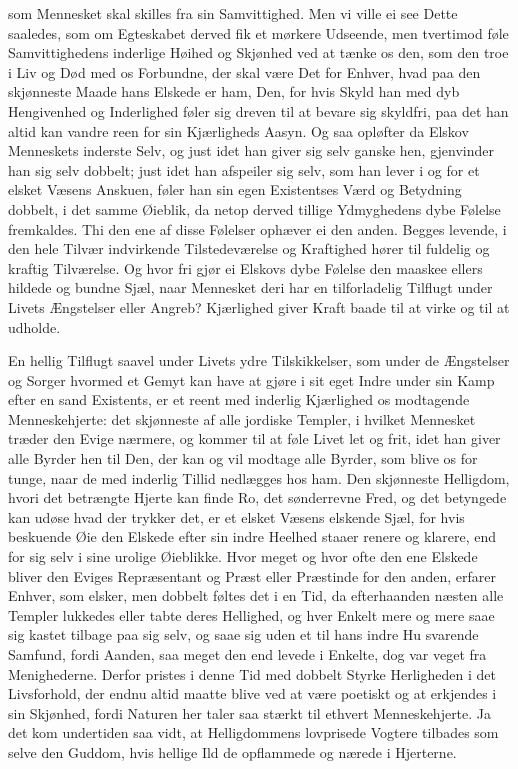 \documentclass[12pt,a4paper]{book}
\newcommand{\apage}[1]{\marginnote{\footnotesize\textit{[#1]}}}
\begin{document}
som Mennesket skal skilles fra sin Samvittighed. Men vi ville ei see
Dette saaledes, som om Egteskabet derved fik et mørkere Udseende, men
tvertimod føle Samvittighedens inderlige Høihed og Skjønhed ved at
tænke os den, som den troe i Liv og Død med os Forbundne, der skal være
Det for Enhver, hvad paa den skjønneste Maade hans Elskede er ham, Den,
for hvis Skyld han med dyb Hengivenhed og Inderlighed føler sig dreven
til at bevare sig skyldfri, paa det han altid kan vandre reen for sin
Kjærligheds Aasyn. Og saa opløfter da Elskov Menneskets inderste Selv,
og just idet han giver sig selv ganske hen, gjenvinder han sig selv
dobbelt; just \apage{36} idet han afspeiler sig selv, som han lever i og for et
elsket Væsens Anskuen, føler han sin egen Existentses Værd og Betydning
dobbelt, i det samme Øieblik, da netop derved tillige Ydmyghedens dybe
Følelse fremkaldes. Thi den ene af disse Følelser ophæver ei den anden.
Begges levende, i den hele Tilvær indvirkende Tilstedeværelse og
Kraftighed hører til fuldelig og kraftig Tilværelse. Og hvor fri gjør
ei Elskovs dybe Følelse den maaskee ellers hildede og bundne Sjæl, naar
Mennesket deri har en tilforladelig Tilflugt under Livets Ængstelser
eller Angreb? Kjærlighed giver Kraft baade til at virke og til at
udholde.

En hellig Tilflugt saavel under Livets ydre Tilskikkelser, som under de
Ængstelser og Sorger hvormed et Gemyt kan have at gjøre i sit eget Indre
under sin Kamp efter en sand Existents, er et reent med inderlig
Kjærlighed os modtagende Menneskehjerte: det skjønneste af alle jordiske
Templer, i hvilket Mennesket træder den Evige nærmere, og kommer til at
føle Livet let og frit, idet han giver alle Byrder hen til Den, der kan
og vil modtage alle Byrder, som blive os for tunge, naar de med inderlig
Tillid nedlægges hos ham. Den skjønneste Helligdom, hvori det betrængte
Hjerte kan finde Ro, det sønderrevne Fred, og det betyngede kan udøse
hvad der trykker det, er et elsket Væsens elskende Sjæl, for hvis
beskuende Øie den Elskede efter sin indre Heelhed staaer renere og
klarere, end for sig selv i sine urolige Øieblikke. Hvor meget og hvor \apage{37}
ofte den ene Elskede bliver den Eviges Repræsentant og Præst eller
Præstinde for den anden, erfarer Enhver, som elsker, men dobbelt føltes
det i en Tid, da efterhaanden næsten alle Templer lukkedes eller tabte
deres Hellighed, og hver Enkelt mere og mere saae sig kastet tilbage
paa sig selv, og saae sig uden et til hans indre Hu svarende Samfund,
fordi Aanden, saa meget den end levede i Enkelte, dog var veget fra
Menighederne. Derfor pristes i denne Tid med dobbelt Styrke Herligheden
i det Livsforhold, der endnu altid maatte blive ved at være poetiskt og
at erkjendes i sin Skjønhed, fordi Naturen her taler saa stærkt til
ethvert Menneskehjerte. Ja det kom undertiden saa vidt, at Helligdommens
lovprisede Vogtere tilbades som selve den Guddom, hvis hellige Ild de
opflammede og nærede i Hjerterne.
\end{document}
